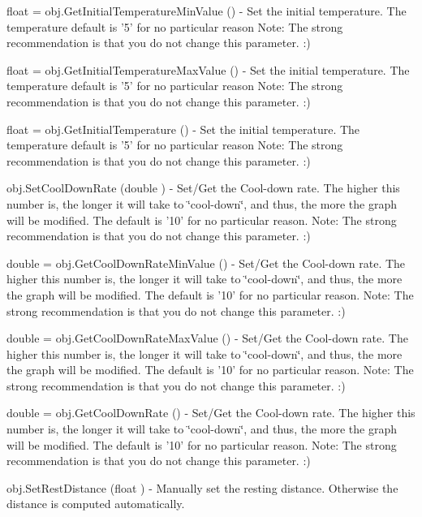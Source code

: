 \begin{DoxyItemize}
\item {\ttfamily float = obj.\-Get\-Initial\-Temperature\-Min\-Value ()} -\/ Set the initial temperature. The temperature default is '5' for no particular reason Note\-: The strong recommendation is that you do not change this parameter. \-:)  
\item {\ttfamily float = obj.\-Get\-Initial\-Temperature\-Max\-Value ()} -\/ Set the initial temperature. The temperature default is '5' for no particular reason Note\-: The strong recommendation is that you do not change this parameter. \-:)  
\item {\ttfamily float = obj.\-Get\-Initial\-Temperature ()} -\/ Set the initial temperature. The temperature default is '5' for no particular reason Note\-: The strong recommendation is that you do not change this parameter. \-:)  
\item {\ttfamily obj.\-Set\-Cool\-Down\-Rate (double )} -\/ Set/\-Get the Cool-\/down rate. The higher this number is, the longer it will take to \char`\"{}cool-\/down\char`\"{}, and thus, the more the graph will be modified. The default is '10' for no particular reason. Note\-: The strong recommendation is that you do not change this parameter. \-:)  
\item {\ttfamily double = obj.\-Get\-Cool\-Down\-Rate\-Min\-Value ()} -\/ Set/\-Get the Cool-\/down rate. The higher this number is, the longer it will take to \char`\"{}cool-\/down\char`\"{}, and thus, the more the graph will be modified. The default is '10' for no particular reason. Note\-: The strong recommendation is that you do not change this parameter. \-:)  
\item {\ttfamily double = obj.\-Get\-Cool\-Down\-Rate\-Max\-Value ()} -\/ Set/\-Get the Cool-\/down rate. The higher this number is, the longer it will take to \char`\"{}cool-\/down\char`\"{}, and thus, the more the graph will be modified. The default is '10' for no particular reason. Note\-: The strong recommendation is that you do not change this parameter. \-:)  
\item {\ttfamily double = obj.\-Get\-Cool\-Down\-Rate ()} -\/ Set/\-Get the Cool-\/down rate. The higher this number is, the longer it will take to \char`\"{}cool-\/down\char`\"{}, and thus, the more the graph will be modified. The default is '10' for no particular reason. Note\-: The strong recommendation is that you do not change this parameter. \-:)  
\item {\ttfamily obj.\-Set\-Rest\-Distance (float )} -\/ Manually set the resting distance. Otherwise the distance is computed automatically.  

\end{DoxyItemize}
